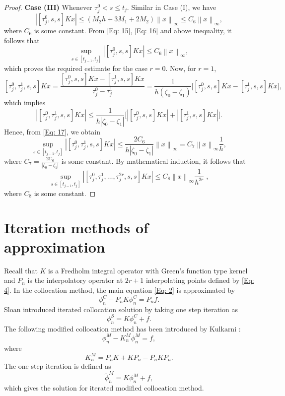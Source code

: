 \documentclass[sn-mathphys-num]{sn-jnl}%
\theoremstyle{thmstyleone}%
\theoremstyle{thmstyletwo}%
\theoremstyle{thmstylethree}%
\newcommand{\norm}[1]{\left\lVert #1\right\rVert}
\begin{document}
\begin{proof}
	
	\noindent
	\textbf{Case (III)}
	Whenever $\tau_j^0<s \le t_j$. Similar in Case (I), we have
	$$
	\left |[\tau_j^0,s,s]Kx \right| \le \left ( M_2 h +3 M_1  + 2 M_2 \right )\norm{x}_\infty \le C_6 \norm{x}_\infty, 
	$$
	where $C_6$ is some constant. From \eqref{Eq: 15}, \eqref{Eq: 16} and above inequality, it follows that
	\begin{equation}\label{Eq: 17}
		\sup_{s \in [t_{j-1},t_j]} \left|[\tau_j^0,s,s]Kx \right| \le C_6 \norm{x}_\infty,
	\end{equation}
	which proves the required estimate for the case $r = 0$. Now, for $r=1$,
	$$
	[\tau_j^0,\tau_j^1,s,s]Kx  = \dfrac{[\tau_j^0,s,s]Kx-[\tau_j^1,s,s]Kx}{\tau_j^0-\tau_j^1} = \frac{1}{h (\zeta_0-\zeta_1) } \bigg [[\tau_j^0,s,s]Kx-[\tau_j^1,s,s]Kx \bigg],
	$$
	which implies
	$$
	\left |[\tau_j^0,\tau_j^1,s,s]Kx \right | 	\le \frac{1}{h | \zeta_0-\zeta_1 |} \bigg [\left|[\tau_j^0,s,s]Kx\right|+\left|[\tau_j^1,s,s]Kx\right| \bigg].
	$$
	Hence, from \eqref{Eq: 17}, we obtain
	$$
	\sup_{s \in [t_{j-1},t_j]} \left|[\tau_j^0,\tau_j^1,s,s]Kx \right| \le \frac{2C_6}{h | \zeta_0-\zeta_1 |} \norm{x}_\infty = C_7 \norm{x}_\infty \frac{1}{h},
	$$
	where $C_7= \frac{2C_6}{| \zeta_0-\zeta_1 |}$ is some constant.
	By mathematical induction, it follows that
	$$
	\sup_{s \in [t_{j-1},t_j]} \left|[\tau_j^0,\tau_j^1,\ldots, \tau_j^{2r},s,s]Kx\right| \le C_8 \norm{x}_\infty \frac{1}{h^{2r}} \;,
	$$
	where $C_8$ is some constant.
\end{proof}


\section{Iteration methods of approximation}
Recall that $K$ is a Fredholm integral operator with Green's function type kernel and $P_n$ is the interpolatory operator at $2r+1$ interpolating points defined by \eqref{Eq: 4}. In the collocation method, the main equation \eqref{Eq: 2} is approximated by
\begin{equation} \label{Eq: 18}
	\phi_{n}^C - P_nK\phi_{n}^C = P_nf.
\end{equation}
Sloan \cite{Sl1} introduced iterated collocation solution by taking one step iteration as
\begin{equation} \label{Eq: 19}
	\phi_{n}^S = K\phi_{n}^C + f.
\end{equation}
The following modified collocation method has been introduced by Kulkarni \cite{RPK1}:
\begin{equation} \label{Eq: 20}
	\phi_{n}^M - K_{n}^M\phi_{n}^M = f,
\end{equation}
where
\[	K_n^M = P_nK + KP_n - P_nKP_n.\]
The one step iteration is defined as
\begin{equation} \label{Eq: 21}
	\tilde{\phi}_n^M=K\phi_n^M+f,
\end{equation}
which gives the solution for iterated modified collocation method.
\end{document}
